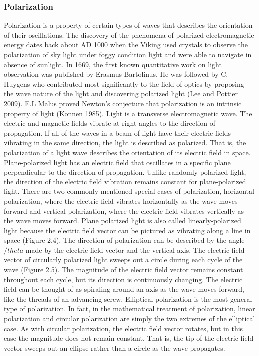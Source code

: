 \subsubsection*{Polarization}
Polarization is a property of certain types of waves that describes the orientation of their oscillations. The discovery of the phenomena of polarized electromagnetic energy dates back about AD 1000 when the Viking used crystals to observe the polarization of sky light under foggy condition light and were able to navigate in absence of sunlight. In 1669, the first known quantitative work on light observation was published by Erasmus Bartolinus. He was followed by C. Huygens who contributed most significantly to the field of optics by proposing the wave nature of the light and discovering polarized light (Lee and Pottier 2009). E.L Malus proved Newton’s conjecture that polarization is an intrinsic property of light (Konnen 1985). 
Light is a transverse electromagnetic wave. The electric and magnetic fields vibrate at right angles to the direction of propagation.  If all of the waves in a beam of light have their electric fields vibrating in the same direction, the light is described as polarized. That is, the polarization of a light wave describes the orientation of its electric field in space. Plane-polarized light has an electric field that oscillates in a specific plane perpendicular to the direction of propagation. Unlike randomly polarized light, the direction of the electric field vibration remains constant for plane-polarized light. There are two commonly mentioned special cases of polarization, horizontal polarization, where the electric field vibrates horizontally as the wave moves forward and vertical polarization, where the electric field vibrates vertically as the wave moves forward. Plane polarized light is also called linearly-polarized light because the electric field vector can be pictured as vibrating along a line in space (Figure 2.4). The direction of polarization can be described by the angle $/theta$ made by the electric field vector and the vertical axis. The electric field vector of circularly polarized light sweeps out a circle during each cycle of the wave (Figure 2.5). The magnitude of the electric field vector remains constant throughout each cycle, but its direction is continuously changing. The electric field can be thought of as spiraling around an axis as the wave moves forward, like the threads of an advancing screw. Elliptical polarization is the most general type of polarization. In fact, in the mathematical treatment of polarization, linear polarization and circular polarization are simply the two extremes of the elliptical case. As with circular polarization, the electric field vector rotates, but in this case the magnitude does not remain constant. That is, the tip of the electric field vector sweeps out an ellipse rather than a circle as the wave propagates. 
